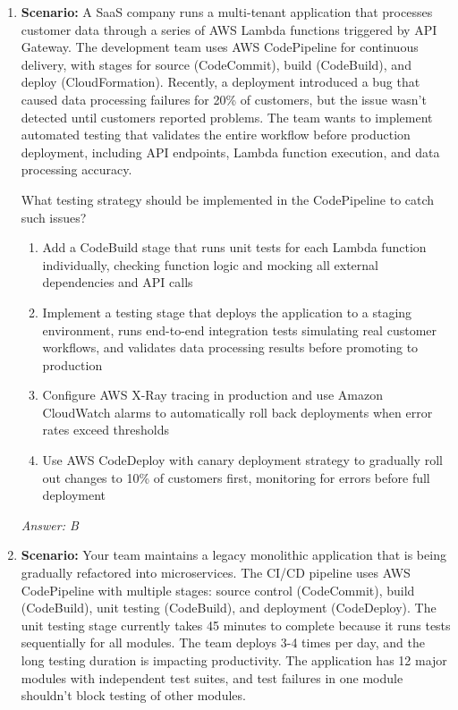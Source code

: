 \documentclass[12pt,a4paper]{article}
\begin{document}
\begin{enumerate}[label=\textbf{Q\arabic*.}]
\textit{Answer: B}


\item \textbf{Scenario:} A SaaS company runs a multi-tenant application that processes customer data through a series of AWS Lambda functions triggered by API Gateway. The development team uses AWS CodePipeline for continuous delivery, with stages for source (CodeCommit), build (CodeBuild), and deploy (CloudFormation). Recently, a deployment introduced a bug that caused data processing failures for 20\% of customers, but the issue wasn't detected until customers reported problems. The team wants to implement automated testing that validates the entire workflow before production deployment, including API endpoints, Lambda function execution, and data processing accuracy.

What testing strategy should be implemented in the CodePipeline to catch such issues?

\begin{enumerate}[label=\Alph*.]
    \item Add a CodeBuild stage that runs unit tests for each Lambda function individually, checking function logic and mocking all external dependencies and API calls
    \item Implement a testing stage that deploys the application to a staging environment, runs end-to-end integration tests simulating real customer workflows, and validates data processing results before promoting to production
    \item Configure AWS X-Ray tracing in production and use Amazon CloudWatch alarms to automatically roll back deployments when error rates exceed thresholds
    \item Use AWS CodeDeploy with canary deployment strategy to gradually roll out changes to 10\% of customers first, monitoring for errors before full deployment
\end{enumerate}

\textit{Answer: B}

\item \textbf{Scenario:} Your team maintains a legacy monolithic application that is being gradually refactored into microservices. The CI/CD pipeline uses AWS CodePipeline with multiple stages: source control (CodeCommit), build (CodeBuild), unit testing (CodeBuild), and deployment (CodeDeploy). The unit testing stage currently takes 45 minutes to complete because it runs tests sequentially for all modules. The team deploys 3-4 times per day, and the long testing duration is impacting productivity. The application has 12 major modules with independent test suites, and test failures in one module shouldn't block testing of other modules.


\end{enumerate}
\end{document}

